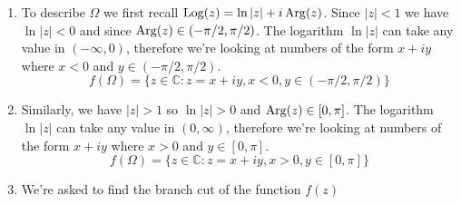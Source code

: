 \begin{enumerate}
		      \item To describe $\Omega$ we first recall $\operatorname{Log}(z) =
			            \ln|z|
			            + i\operatorname{Arg}(z)$. Since $|z| < 1$ we have
		            $\ln|z| < 0$
		            and since $\operatorname{Arg}(z) \in
			            (-\pi/2, \pi/2)$. The logarithm $\ln|z|$
		            can take
		            any value in $(-\infty, 0)$, therefore we're
		            looking at
		            numbers of the form $x + iy$ where $x < 0$ and $y
			            \in
			            (-\pi/2, \pi/2)$.
		            \begin{equation*}
			            f(\Omega) = \{z \in \mathbb{C} : z = x +
			            iy, x <
			            0, y \in (-\pi/2, \pi/2)\}
		            \end{equation*}
		      \item Similarly, we have $|z| > 1$ so $\ln|z| > 0$ and
		            $\operatorname{Arg}(z) \in [0, \pi]$. The logarithm $\ln|z|$ can
		            take any value in $(0, \infty)$, therefore we're
		            looking at numbers of the form $x + iy$ where $x >
			            0$
		            and
		            $y \in [0, \pi]$.
		            \begin{equation*}
			            f(\Omega) = \{z \in \mathbb{C} : z = x +
			            iy, x >
			            0, y \in [0, \pi]\}
		            \end{equation*}

		      \item We're asked to find the branch cut of the function
		            $f(z)$

	      \end{enumerate}